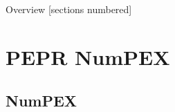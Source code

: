 \titleframe

\begin{frame}{Overview}
  [sections numbered]
  \tableofcontents[hideallsubsections]
\end{frame}


\section{PEPR NumPEX}

\subsection*{NumPEX}
